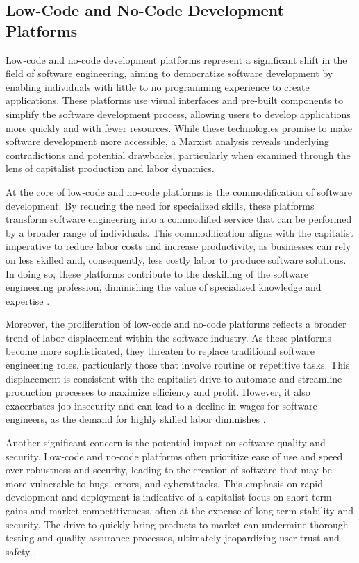 \begin{refsection}
\subsection{Low-Code and No-Code Development Platforms}

Low-code and no-code development platforms represent a significant shift in the field of software engineering, aiming to democratize software development by enabling individuals with little to no programming experience to create applications. These platforms use visual interfaces and pre-built components to simplify the software development process, allowing users to develop applications more quickly and with fewer resources. While these technologies promise to make software development more accessible, a Marxist analysis reveals underlying contradictions and potential drawbacks, particularly when examined through the lens of capitalist production and labor dynamics.

At the core of low-code and no-code platforms is the commodification of software development. By reducing the need for specialized skills, these platforms transform software engineering into a commodified service that can be performed by a broader range of individuals. This commodification aligns with the capitalist imperative to reduce labor costs and increase productivity, as businesses can rely on less skilled and, consequently, less costly labor to produce software solutions. In doing so, these platforms contribute to the deskilling of the software engineering profession, diminishing the value of specialized knowledge and expertise \cite[pp.~110-113]{fuchs2014digital}.

Moreover, the proliferation of low-code and no-code platforms reflects a broader trend of labor displacement within the software industry. As these platforms become more sophisticated, they threaten to replace traditional software engineering roles, particularly those that involve routine or repetitive tasks. This displacement is consistent with the capitalist drive to automate and streamline production processes to maximize efficiency and profit. However, it also exacerbates job insecurity and can lead to a decline in wages for software engineers, as the demand for highly skilled labor diminishes \cite[pp.~56-59]{marx2008capital}.

Another significant concern is the potential impact on software quality and security. Low-code and no-code platforms often prioritize ease of use and speed over robustness and security, leading to the creation of software that may be more vulnerable to bugs, errors, and cyberattacks. This emphasis on rapid development and deployment is indicative of a capitalist focus on short-term gains and market competitiveness, often at the expense of long-term stability and security. The drive to quickly bring products to market can undermine thorough testing and quality assurance processes, ultimately jeopardizing user trust and safety \cite[pp.~150-153]{russell2021human}.


\end{refsection}
